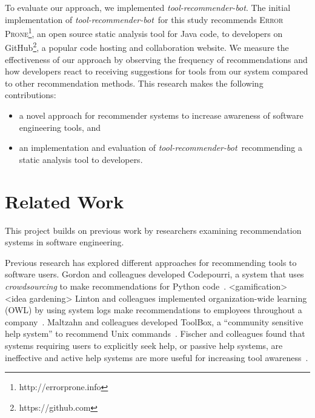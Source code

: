 \documentclass[sigconf,review,anonymous]{acmart}
\newcommand{\tool}{\textsl{tool-recommender-bot}}
\begin{document}

To evaluate our approach, we implemented \tool. The initial implementation of \tool~for this study recommends \textsc{Error Prone}\footnote{http://errorprone.info}, an open source static analysis tool for Java code, to developers on GitHub\footnote{https://github.com}, a popular code hosting and collaboration website. We measure the effectiveness of our approach by observing the frequency of recommendations and how developers react to receiving suggestions for tools from our system compared to other recommendation methods. This research makes the following contributions:

\begin{itemize}
 \item a novel approach for recommender systems to increase awareness of software engineering tools, and
 \item an implementation and evaluation of \tool~recommending a static analysis tool to developers.
 \end{itemize}

\section{Related Work}
This project builds on previous work by researchers examining recommendation systems in software engineering.

Previous research has explored different approaches for recommending tools to software users. Gordon and colleagues developed Codepourri, a system that uses \textit{crowdsourcing} to make recommendations for Python code~\cite{Gordon2015Codepourri}. <gamification> <idea gardening> Linton and colleagues implemented organization-wide learning (OWL) by using system logs make recommendations to employees throughout a company~\cite{Linton2000OWL}. Maltzahn and colleagues developed ToolBox, a ``community sensitive help system'' to recommend Unix commands~\cite{Maltzahn1995Toolbox}. Fischer and colleagues found that systems requiring users to explicitly seek help, or passive help systems, are ineffective and active help systems are more useful for increasing tool awareness~\cite{Fischer1984ActiveHelpSystems}.
\end{document}
